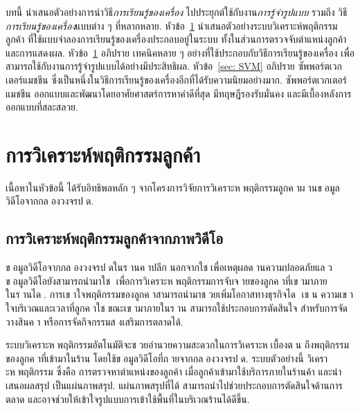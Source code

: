 \vspace{1cm}

บทนี้
นำเสนอตัวอย่างการนำวิธี\textit{การเรียนรู้ของเครื่อง} ไปประยุกต์ใช้กับงาน\textit{การรู้จำรูปแบบ}
รวมถึง 
วิธี\textit{การเรียนรู้ของเครื่อง}แบบต่าง ๆ ที่หลากหลาย.
หัวข้อ~\ref{sec: customer behavior analytics} นำเสนอตัวอย่างระบบวิเคราะห์พฤติกรรมลูกค้า
ที่ใช้แบบจำลองการเรียนรู้ของเครื่องประกอบอยู่ในระบบ ทั้งในส่วนการตรวจจับตำแหน่งลูกค้า และการแสดงผล.
หัวข้อ~\ref{sec: customer behavior analytics}
อภิปราย เทคนิคหลาย ๆ อย่างที่ใช้ประกอบกับวิธีการเรียนรู้ของเครื่อง 
เพื่อสามารถใช้กับงานการรู้จำรูปแบบได้อย่างมีประสิทธิผล.
หัวข้อ~\ref{sec: SVM}
อภิปราย ซัพพอร์ตเวกเตอร์แมชชีน ซึ่งเป็นหนึ่งในวิธีการเรียนรู้ของเครื่องอีกที่ได้รับความนิยมอย่างมาก.
ซัพพอร์ตเวกเตอร์แมชชีน ออกแบบและพัฒนาโดยอาศัยศาสตร์การหาค่าดีที่สุด
มีทฤษฎีรองรับมั่นคง และมีเบื้องหลังการออกแบบที่สละสลวย.

\section{การวิเคราะห์พฤติกรรมลูกค้า}
\label{sec: customer behavior analytics}

เนื้อหาในหัวข้อนี้ ได้รับอิทธิพลหลัก ๆ จากโครงการวิจัยการวิเคราะหพฤติกรรมลูกคาผานขอมูลวิดีโอจากกลองวงจรปด\cite{KatanyukulPonsawat2017a}.

\subsection{การวิเคราะห์พฤติกรรมลูกค้าจากภาพวิดีโอ}

ขอมูลวิดีโอจากกลองวงจรปดในรานคาปลีก 
นอกจากใชเพื่อเหตุผลดานความปลอดภัยแลว 
ขอมูลวิดีโอยังสามารถนำมาใช
เพื่อการวิเคราะหพฤติกรรมการจับจายของลูกคาที่เขามาภายในรานได. 
การเขาใจพฤติกรรมของลูกคาสามารถนำมาชวยเพิ่มโอกาสทางธุรกิจได 
เชน ความเขาใจบริเวณและเวลาที่ลูกคาใชขณะเขามาภายในราน 
สามารถใช้ประกอบการตัดสินใจ
สำหรับการจัดวางสินคา
หรือการจัดกิจกรรมสงเสริมการตลาดได้.

ระบบวิเคราะหพฤติกรรมอัตโนมัติจะชวยอำนวยความสะดวกในการวิเคราะหเบื้องตน ถึงพฤติกรรมของลูกคาที่เข้ามาในร้าน โดยใช้ขอมูลวิดีโอที่ถายจากกลองวงจรปด.
ระบบตัวอย่างนี้
วิเคราะหพฤติกรรม ซึ่งคือ การตรวจหาตำแหน่งของลูกค้า เมื่อลูกค้าเข้ามาใช้บริการภายในร้านค้า
และนำเสนอผลสรุป เป็นแผ่นภาพสรุป.
แผ่นภาพสรุปที่ได้ สามารถนำไปช่วยประกอบการตัดสินใจด้านการตลาด
และอาจช่วยให้เข้าใจรูปแบบการเข้าใช้พื้นที่ในบริเวณร้านได้ดีขึ้น.

